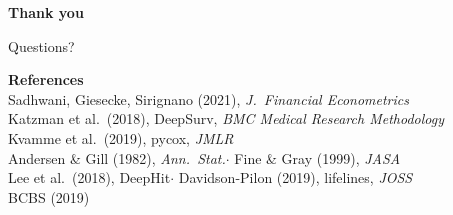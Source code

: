 \documentclass[10pt,aspectratio=169]{beamer}
\begin{document}
\begin{frame}[plain]
    \vspace*{1.5em}
    \begin{center}
        {\Huge \textbf{Thank you}}

        \vspace{1.5em}

        {\Large Questions?}

        \vspace{2.5em}

        \begin{minipage}{0.8\textwidth}
            \centering
            \small
            \textbf{References}\\[0.5em]
            Sadhwani, Giesecke, Sirignano (2021), \emph{J.\ Financial Econometrics}\\
            Katzman et al.\ (2018), DeepSurv, \emph{BMC Medical Research Methodology}\\
            Kvamme et al.\ (2019), pycox, \emph{JMLR}\\
            Andersen \& Gill (1982), \emph{Ann.\ Stat.}\enspace$\cdot$\enspace
            Fine \& Gray (1999), \emph{JASA}\\
            Lee et al.\ (2018), DeepHit\enspace$\cdot$\enspace
            Davidson-Pilon (2019), lifelines, \emph{JOSS}\\
            BCBS (2019)
        \end{minipage}
    \end{center}
\end{frame}

\appendix
\end{document}
